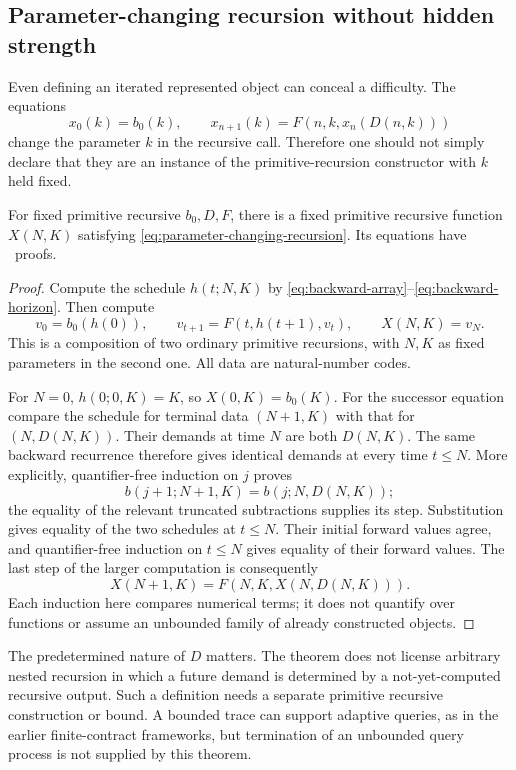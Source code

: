 \subsection{Parameter-changing recursion without hidden strength}

Even defining an iterated represented object can conceal a difficulty.
The equations
\begin{equation}\label{eq:parameter-changing-recursion}
 x_0(k)=b_0(k),\qquad
 x_{n+1}(k)=F(n,k,x_n(D(n,k)))
\end{equation}
change the parameter $k$ in the recursive call.  Therefore one should not
simply declare that they are an instance of the primitive-recursion
constructor with $k$ held fixed.

\begin{theorem}
\label{thm:parameter-changing-recursion}
For fixed primitive recursive $b_0,D,F$, there is a fixed primitive
recursive function $X(N,K)$ satisfying
\eqref{eq:parameter-changing-recursion}.  Its equations have \ipra\ proofs.
\end{theorem}

\begin{proof}
Compute the schedule $h(t;N,K)$ by
\eqref{eq:backward-array}--\eqref{eq:backward-horizon}.  Then compute
\[
 v_0=b_0(h(0)),\qquad
 v_{t+1}=F(t,h(t+1),v_t),\qquad X(N,K)=v_N.
\]
This is a composition of two ordinary primitive recursions, with $N,K$
as fixed parameters in the second one.  All data are natural-number codes.

For $N=0$, $h(0;0,K)=K$, so $X(0,K)=b_0(K)$.  For the successor
equation compare the schedule for terminal data $(N+1,K)$ with that for
$(N,D(N,K))$.  Their demands at time $N$ are both $D(N,K)$.  The same
backward recurrence therefore gives identical demands at every time
$t\le N$.  More explicitly, quantifier-free induction on $j$ proves
\[
 b(j+1;N+1,K)=b(j;N,D(N,K));
\]
the equality of the relevant truncated subtractions supplies its step.
Substitution gives equality of the two schedules at $t\le N$.
Their initial forward values agree, and quantifier-free induction on
$t\le N$ gives equality of their forward values.  The last step of the
larger computation is consequently
\[
       X(N+1,K)=F(N,K,X(N,D(N,K))).
\]
Each induction here compares numerical terms; it does not quantify over
functions or assume an unbounded family of already constructed objects.
\end{proof}

The predetermined nature of $D$ matters.  The theorem does not license
arbitrary nested recursion in which a future demand is determined by a
not-yet-computed recursive output.  Such a definition needs a separate
primitive recursive construction or bound.  A bounded trace can support
adaptive queries, as in the earlier finite-contract frameworks, but
termination of an unbounded query process is not supplied by this theorem.

